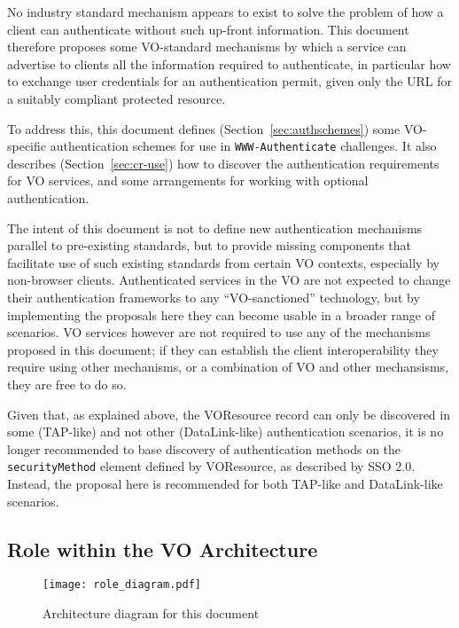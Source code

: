 \documentclass[11pt,a4paper]{ivoa}
\newcommand{\header}[1]{{\tt #1}}
\begin{document}
No industry standard mechanism appears to exist to solve the
problem of how a client can authenticate without such up-front
information.
This document therefore proposes some VO-standard mechanisms
by which a service can advertise to clients all the information
required to authenticate,
in particular how to exchange user credentials for an authentication permit,
given only the URL for a suitably compliant protected resource.

To address this, this document defines (Section~\ref{sec:authschemes})
some VO-specific authentication schemes
for use in \header{WWW-Authenticate} challenges.
It also describes (Section~\ref{sec:cr-use}) how to discover the
authentication requirements for VO services, and
some arrangements for working with optional authentication.

The intent of this document is not to define new authentication
mechanisms parallel to pre-existing standards, but to provide
missing components that facilitate use of such existing standards
from certain VO contexts, especially by non-browser clients.
Authenticated services in the VO are not expected to change their
authentication frameworks to any ``VO-sanctioned'' technology,
but by implementing the proposals here they can become usable
in a broader range of scenarios.
VO services however are not required to use any of the
mechanisms proposed in this document; if they can establish the
client interoperability they require using other mechanisms, or
a combination of VO and other mechansisms, they are free to do so.

Given that, as explained above,
the VOResource record can only be discovered in some (TAP-like)
and not other (DataLink-like) authentication scenarios,
it is no longer recommended to base discovery of authentication methods
on the {\tt securityMethod} element
defined by VOResource, as described by SSO 2.0.
Instead, the proposal here is recommended for both TAP-like and DataLink-like
scenarios.

\subsection{Role within the VO Architecture}

\begin{figure}
\centering


\texttt{[image: role\_diagram.pdf]}
\caption{Architecture diagram for this document}
\label{fig:archdiag}
\end{figure}
\end{document}
